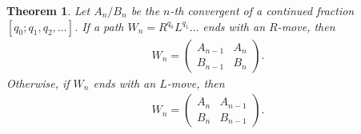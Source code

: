 \documentclass[10pt,a4paper]{amsart}
\newtheorem{theorem}{Theorem}
\begin{document}
\begin{theorem} \label{Th: Convergent Matrix} 
Let $ A_n/B_n $ be the $ n $-th convergent of a continued fraction $ [q_0; q_1, q_2, \ldots] $. If a path $ W_n = R^{q_0} L^{q_1} \ldots $ ends with an $ R $-move, then 
\begin{align*}
	W_n = \begin{pmatrix} A_{n - 1} & A_n \\ B_{n - 1} & B_n \end{pmatrix}.
\end{align*}
Otherwise, if $ W_n $ ends with an $ L $-move, then 
\begin{align*}
	W_n = \begin{pmatrix} A_n & A_{n - 1} \\ B_n & B_{n - 1} \end{pmatrix}.
\end{align*}
\end{theorem}
\end{document}
